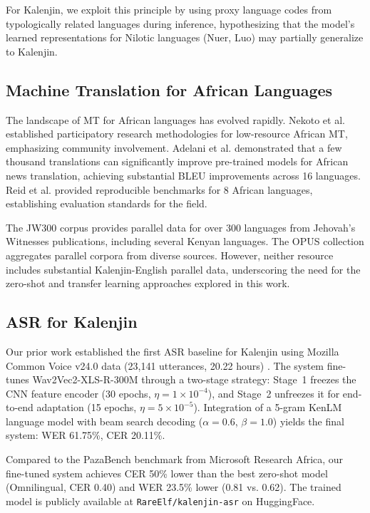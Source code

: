 \documentclass[conference]{IEEEtran}
\begin{document}
For Kalenjin, we exploit this principle by using proxy language codes from typologically related languages during inference, hypothesizing that the model's learned representations for Nilotic languages (Nuer, Luo) may partially generalize to Kalenjin.

\subsection{Machine Translation for African Languages}

The landscape of MT for African languages has evolved rapidly. Nekoto et al. \cite{nekoto2020participatory} established participatory research methodologies for low-resource African MT, emphasizing community involvement. Adelani et al. \cite{adelani2022few} demonstrated that a few thousand translations can significantly improve pre-trained models for African news translation, achieving substantial BLEU improvements across 16 languages. Reid et al. \cite{reid2021afromt} provided reproducible benchmarks for 8 African languages, establishing evaluation standards for the field.

The JW300 corpus \cite{agic2016jw300} provides parallel data for over 300 languages from Jehovah's Witnesses publications, including several Kenyan languages. The OPUS collection \cite{tiedemann2020opus} aggregates parallel corpora from diverse sources. However, neither resource includes substantial Kalenjin-English parallel data, underscoring the need for the zero-shot and transfer learning approaches explored in this work.

\subsection{ASR for Kalenjin}

Our prior work established the first ASR baseline for Kalenjin using Mozilla Common Voice v24.0 data (23,141 utterances, 20.22 hours) \cite{ardila2020common}. The system fine-tunes Wav2Vec2-XLS-R-300M \cite{babu2022xls} through a two-stage strategy: Stage~1 freezes the CNN feature encoder (30 epochs, $\eta = 1 \times 10^{-4}$), and Stage~2 unfreezes it for end-to-end adaptation (15 epochs, $\eta = 5 \times 10^{-5}$). Integration of a 5-gram KenLM language model \cite{heafield2011kenlm} with beam search decoding ($\alpha = 0.6$, $\beta = 1.0$) yields the final system: WER 61.75\%, CER 20.11\%.

Compared to the PazaBench benchmark \cite{pazabench2026} from Microsoft Research Africa, our fine-tuned system achieves CER 50\% lower than the best zero-shot model (Omnilingual, CER 0.40) and WER 23.5\% lower (0.81 vs. 0.62). The trained model is publicly available at \texttt{RareElf/kalenjin-asr} on HuggingFace.
\end{document}
